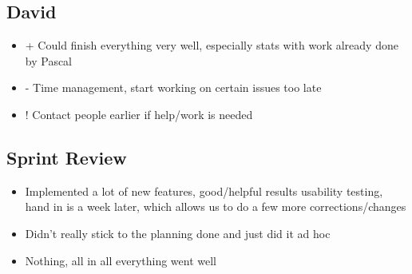 \subsection{David}
\begin{itemize}
    \item + Could finish everything very well, especially stats with work already done by Pascal
    \item - Time management, start working on certain issues too late
    \item ! Contact people earlier if help/work is needed
\end{itemize}

\subsection{Sprint Review}
\begin{itemize}
    \item Implemented a lot of new features, good/helpful results usability testing, hand in is a week later, which allows us to do a few more corrections/changes
    \item Didn't really stick to the planning done and just did it ad hoc
    \item Nothing, all in all everything went well
\end{itemize}
